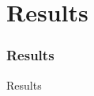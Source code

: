 \section{Results}

\begin{frame}
    \frametitle{Results}
    \begin{block}{Results}
    \end{block}
\end{frame}